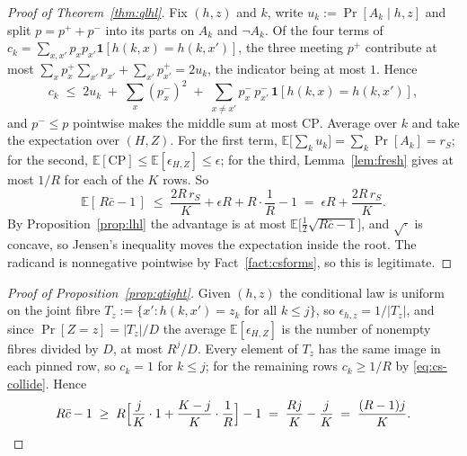 \documentclass{aicr-solution}
\newcommand{\CP}{\mathrm{CP}}
\begin{document}
\begin{proof}[Proof of Theorem~\ref{thm:qlhl}]
Fix $(h,z)$ and $k$, write $u_k := \Pr[A_k \mid h,z]$ and split $p = p^{+} + p^{-}$ into its parts on
$A_k$ and $\neg A_k$. Of the four terms of $c_k = \sum_{x,x'}p_x p_{x'}\mathbf{1}[h(k,x)=h(k,x')]$,
the three meeting $p^{+}$ contribute at most
$\sum_x p^{+}_x \sum_{x'} p_{x'} + \sum_{x'} p^{+}_{x'} = 2u_k$, the indicator being at most $1$.
Hence
\[
  c_k \;\le\; 2u_k \;+\; \sum_{x}(p^{-}_{x})^2 \;+\;
    \sum_{x \neq x'} p^{-}_{x}\,p^{-}_{x'}\,\mathbf{1}[h(k,x)=h(k,x')] ,
\]
and $p^{-} \le p$ pointwise makes the middle sum at most $\CP$. Average over $k$ and take the expectation over $(H,Z)$. For the first term,
$\mathbb{E}\bigl[\sum_k u_k\bigr] = \sum_k \Pr[A_k] = r_S$; for the second,
$\mathbb{E}[\CP] \le \mathbb{E}[\epsilon_{H,Z}] \le \epsilon$; for the third,
Lemma~\ref{lem:fresh} gives at most $1/R$ for each of the $K$ rows. So
\[
  \mathbb{E}[\,R\bar c - 1\,] \;\le\; \frac{2R\,r_S}{K} + \epsilon R + R\cdot\frac1R - 1
  \;=\; \epsilon R + \frac{2R\,r_S}{K} .
\]
By Proposition~\ref{prop:lhl} the advantage is at most
$\mathbb{E}\bigl[\tfrac12\sqrt{R\bar c - 1}\bigr]$, and $\sqrt{\cdot}$ is concave, so Jensen's
inequality moves the expectation inside the root. The radicand is nonnegative pointwise by
Fact~\ref{fact:csforms}, so this is legitimate.
\end{proof}
\begin{proof}[Proof of Proposition~\ref{prop:qtight}]
Given $(h,z)$ the conditional law is uniform on the joint fibre
$T_z := \{x' : h(k,x') = z_k \text{ for all } k \le j\}$, so $\epsilon_{h,z} = 1/|T_z|$, and since
$\Pr[Z = z] = |T_z|/D$ the average $\mathbb{E}[\epsilon_{H,Z}]$ is the number of nonempty fibres
divided by $D$, at most $R^{j}/D$. Every element of $T_z$ has the same image in each pinned row, so
$c_k = 1$ for $k \le j$; for the remaining rows $c_k \ge 1/R$ by \eqref{eq:cs-collide}. Hence
\[
  R\bar c - 1 \;\ge\; R\Bigl[\frac{j}{K}\cdot 1 + \frac{K-j}{K}\cdot\frac1R\Bigr] - 1
  \;=\; \frac{Rj}{K} - \frac{j}{K} \;=\; \frac{(R-1)j}{K} . \qedhere
\]
\end{proof}
\end{document}
